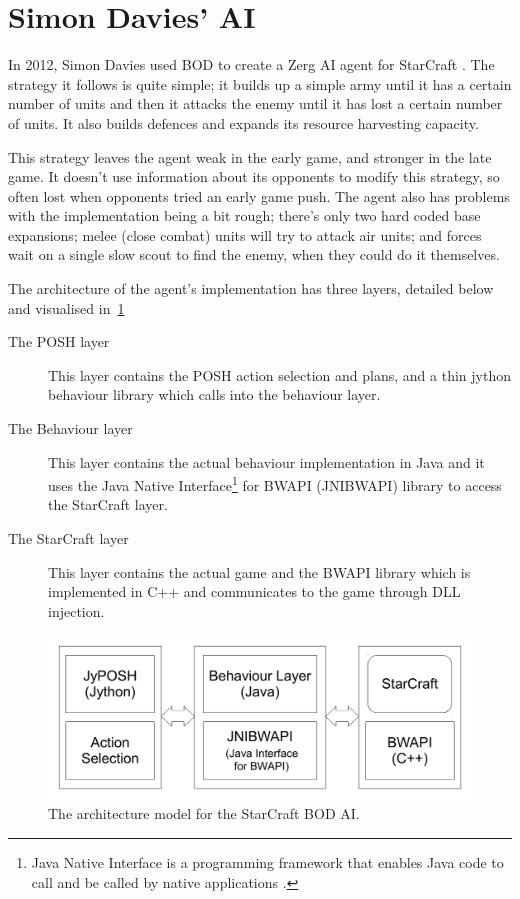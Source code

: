 \documentclass[11pt,openright,a4paper]{report}
\begin{document}
\section{Simon Davies' AI}
In 2012, Simon Davies used BOD to create a Zerg AI agent for StarCraft \cite{davies2012}. The strategy it follows is quite simple; it builds up a simple army until it has a certain number of units and then it attacks the enemy until it has lost a certain number of units. It also builds defences and expands its resource harvesting capacity.

This strategy leaves the agent weak in the early game, and stronger in the late game. It doesn't use information about its opponents to modify this strategy, so often lost when opponents tried an early game push. The agent also has problems with the implementation being a bit rough; there's only two hard coded base expansions; melee (close combat) units will try to attack air units; and forces wait on a single slow scout to find the enemy, when they could do it themselves.

The architecture of the agent's implementation has three layers, detailed below and visualised in~\ref{fig:AI-Architecture}
\begin{description}
\item[The POSH layer] This layer contains the POSH action selection and plans, and a thin jython behaviour library which calls into the behaviour layer.
\item[The Behaviour layer] This layer contains the actual behaviour implementation in Java and it uses the Java Native Interface\footnote{Java Native Interface is a programming framework that enables Java code to call and be called by native applications \cite{JNIDef}.} for BWAPI (JNIBWAPI) library \cite{JNIBWAPI} to access the StarCraft layer.
\item[The StarCraft layer] This layer contains the actual game and the BWAPI library which is implemented in C++ and communicates to the game through DLL injection.
\end{description}
\begin{figure}[h]
    \centering
    \includegraphics[scale=0.5]{AIArch}
    \caption{The architecture model for the StarCraft BOD AI. \protect\cite{davies2012}}
    \label{fig:AI-Architecture}
\end{figure}
\end{document}
